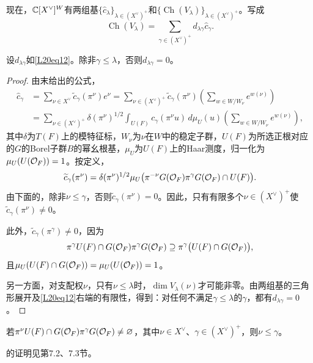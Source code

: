 现在，$\mathbb{C}[X^\vee]^W$有两组基$\{\widehat c_\lambda\}_{\lambda\in(X^\vee)^+}$和$\{\operatorname{Ch}(V_\lambda)\}_{\lambda\in(X^\vee)^+}$。写成
\begin{equation}\tag{1.2}\label{L20eq12}\operatorname{Ch}(V_\lambda)=\sum_{\gamma\in(X^\vee)^+}d_{\lambda\gamma}\widehat c_\gamma.\end{equation}
\begin{lemma}\label{L20S1O1}设$d_{\lambda\gamma}$如\eqref{L20eq12}。除非$\gamma\le\lambda$，否则$d_{\lambda\gamma}=0$。\end{lemma}
\begin{proof}
由末给出的公式，
\begin{align*}
\widehat c_\gamma&=\sum_{\nu\in X^\vee}\widetilde c_\gamma(\pi^\nu)e^\nu
=\sum_{\nu\in(X^\vee)^+}\widetilde c_\gamma(\pi^\nu)\left(\sum_{w\in W/W_\nu}e^{w(\nu)}\right)\\
&=\sum_{\nu\in(X^\vee)^+}\delta(\pi^\nu)^{1/2}\int_{U(F)}c_\gamma(\pi^\nu u)\,d\mu_U(u)\left(\sum_{w\in W/W_\nu}e^{w(\nu)}\right),
\end{align*}
其中$\delta$为$T(F)$上的模特征标，$W_\nu$为$\nu$在$W$中的稳定子群，$U(F)$为所选正根对应的$G$的Borel子群$B$的幂幺根基，$\mu_U$为$U(F)$上的Haar测度，归一化为$\mu_U(U(\mathcal O_F))=1$。按定义，
\[\widetilde c_\gamma(\pi^\nu)=\delta(\pi^\nu)^{1/2}\mu_U\bigl(\pi^{-\nu}G(\mathcal O_F)\pi^\gamma G(\mathcal O_F)\cap U(F)\bigr).\]
由下面的，除非$\nu\le\gamma$，否则$\widetilde c_\gamma(\pi^\nu)=0$。因此，只有有限多个$\nu\in(X^\vee)^+$使$\widetilde c_\gamma(\pi^\nu)\ne0$。

此外，$\widetilde c_\gamma(\pi^\gamma)\ne0$，因为
\[\pi^\gamma U(F)\cap G(\mathcal O_F)\pi^\gamma G(\mathcal O_F)\supseteq\pi^\gamma\bigl(U(F)\cap G(\mathcal O_F)\bigr),\]
且$\mu_U(U(F)\cap G(\mathcal O_F))=\mu_U(U(\mathcal O_F))=1$。

另一方面，对支配权$\nu$，只有$\nu\le\lambda$时，$\dim V_\lambda(\nu)$才可能非零。由两组基的三角形展开及\eqref{L20eq12}右端的有限性，得到：对任何不满足$\gamma\le\lambda$的$\gamma$，都有$d_{\lambda\gamma}=0$。
\end{proof}
\begin{lemma}\label{L20S1O2}
若$\pi^\nu U(F)\cap G(\mathcal O_F)\pi^\gamma G(\mathcal O_F)\ne\varnothing$，其中$\nu\in X^\vee$、$\gamma\in(X^\vee)^+$，则$\nu\le\gamma$。
\end{lemma}
的证明见第7.2、7.3节。

